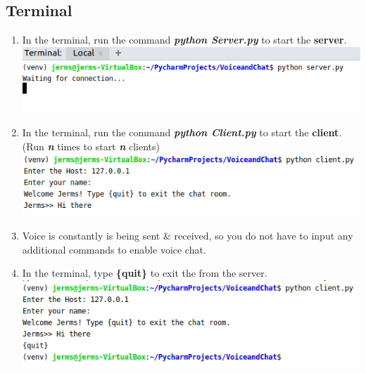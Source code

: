 \documentclass[a4paper,11pt]{article}
\begin{document}
\subsection{Terminal}
\begin{enumerate}
  \item In the terminal, run the command \textbf{\textit{python Server.py}} to start the \textbf{server}.
  \newline
  \includegraphics{server}
  \item In the terminal, run the command \textbf{\textit{python Client.py}} to start the \textbf{client}. (Run \textit{\textbf{n}} times to start \textit{\textbf{n}} clients)
  \newline
  \includegraphics{client}
   \item Voice is constantly is being sent \& received, so you do not have to input any additional commands to enable voice chat. 
   \item In the terminal, type \textbf{\{quit\}} to exit the from the server.
   \newline
   \includegraphics{exit}
\end{enumerate}
\end{document}
